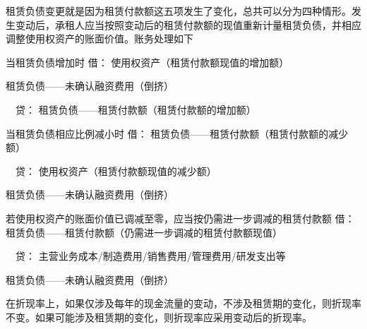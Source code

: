 \documentclass[UTF8,12pt]{ctexart}
\newenvironment{Dr}{\noindent 借：}{\par}
\newenvironment{Cr}{\noindent \ \ 贷：}{\par}
\numberwithin{equation}{section} %
\numberwithin{figure}{section}
\numberwithin{table}{section}
\begin{document}
	租赁负债变更就是因为租赁付款额这五项发生了变化，总共可以分为四种情形。发生变动后，承租人应当按照变动后的租赁付款额的现值重新计量租赁负债，并相应调整使用权资产的账面价值。账务处理如下
	
	当租赁负债增加时
	\begin{Dr}
		使用权资产（租赁付款额现值的增加额） 
		
		租赁负债——未确认融资费用（倒挤）
	\end{Dr}
	\begin{Cr}
		租赁负债——租赁付款额（租赁付款额的增加额）
	\end{Cr}

	当租赁负债相应比例减小时
	\begin{Dr}
		租赁负债——租赁付款额（租赁付款额的减少额）
	\end{Dr}
	\begin{Cr}
		使用权资产（租赁付款额现值的减少额） 
		
		租赁负债——未确认融资费用（倒挤）
	\end{Cr}

	若使用权资产的账面价值已调减至零，应当按仍需进一步调减的租赁付款额
	\begin{Dr}
		租赁负债——租赁付款额（仍需进一步调减的租赁付款额现值）
	\end{Dr}
	\begin{Cr}
		主营业务成本/制造费用/销售费用/管理费用/研发支出等
		
		租赁负债——未确认融资费用（倒挤）
	\end{Cr}
	
	在折现率上，如果仅涉及每年的现金流量的变动，不涉及租赁期的变化，则折现率不变。如果可能涉及租赁期的变化，则折现率应采用变动后的折现率。
\end{document}
